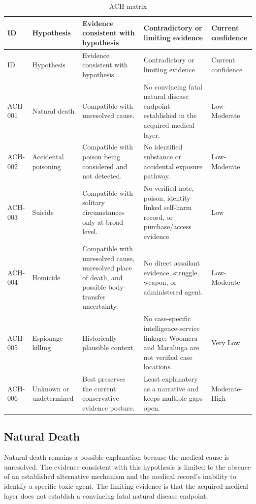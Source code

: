 \begingroup
\scriptsize
\setlength{\tabcolsep}{2pt}
\renewcommand{\arraystretch}{1.12}
\begin{longtable}{>{\raggedright\arraybackslash}p{}>{\raggedright\arraybackslash}p{}>{\raggedright\arraybackslash}p{}>{\raggedright\arraybackslash}p{}>{\raggedright\arraybackslash}p{}}
\caption{ACH matrix}\label{tab:chapter10-ach-matrix}\\
\toprule
ID & Hypothesis & Evidence consistent with hypothesis & Contradictory or limiting evidence & Current confidence \\
\midrule
\endfirsthead
\toprule
ID & Hypothesis & Evidence consistent with hypothesis & Contradictory or limiting evidence & Current confidence \\
\midrule
\endhead
ACH-001 & Natural death & Compatible with unresolved cause. & No convincing fatal natural disease endpoint established in the acquired medical layer. & Low-Moderate \\
ACH-002 & Accidental poisoning & Compatible with poison being considered and not detected. & No identified substance or accidental exposure pathway. & Low-Moderate \\
ACH-003 & Suicide & Compatible with solitary circumstances only at broad level. & No verified note, poison, identity-linked self-harm record, or purchase/access evidence. & Low \\
ACH-004 & Homicide & Compatible with unresolved cause, unresolved place of death, and possible body-transfer uncertainty. & No direct assailant evidence, struggle, weapon, or administered agent. & Low-Moderate \\
ACH-005 & Espionage killing & Historically plausible context. & No case-specific intelligence-service linkage; Woomera and Maralinga are not verified case locations. & Very Low \\
ACH-006 & Unknown or undetermined & Best preserves the current conservative evidence posture. & Least explanatory as a narrative and keeps multiple gaps open. & Moderate-High \\
\bottomrule
\end{longtable}
\endgroup

\subsection{Natural Death}

Natural death remains a possible explanation because the medical cause is unresolved. The evidence consistent with this hypothesis is limited to the absence of an established alternative mechanism and the medical record's inability to identify a specific toxic agent. The limiting evidence is that the acquired medical layer does not establish a convincing fatal natural disease endpoint.

